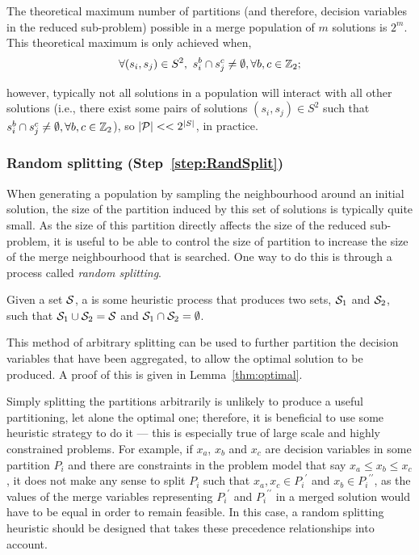 \documentclass[preprint]{elsarticle}
\begin{document}
The theoretical maximum number of partitions (and therefore, decision variables in the reduced sub-problem) possible in a merge population of $m$ solutions is $2^m$. This theoretical maximum is only achieved when,
\begin{equation*}
\forall (s_i,s_j) \in S^2,\ s^b_i \cap s^c_j \neq \emptyset, \forall b,c \in \Bin; \label{sec:merge:part:bound}
\end{equation*}

however, typically not all solutions in a population will interact with all other solutions (i.e., there exist some pairs of solutions $(s_i,s_j) \in S^2$ such that $s^b_i \cap s^c_j \neq \emptyset, \forall b,c \in \Bin$), so $|{\cal P}| << 2^{|S|}$, in practice.

\subsubsection*{\textbf{Random splitting (Step~\ref{step:RandSplit})}}

When generating a population by sampling the neighbourhood around an initial solution, the size of the partition induced by this set of solutions is typically quite small. As the size of this partition directly affects the size of the reduced sub-problem, it is useful to be able to control the size of partition to increase the size of the merge neighbourhood that is searched. One way to do this is through a process called \emph{random splitting}. 
%
\begin{definition}\label{def:split}
Given a set $\S{S}$, a  is some heuristic process that produces two sets, $\S{S}_1$ and $\S{S}_2$, such that $\S{S}_1 \cup \S{S}_2 = \S{S}$ and $\S{S}_1 \cap \S{S}_2 = \emptyset$.
\end{definition}
%
This method of arbitrary splitting can be used to further partition the decision variables that have been aggregated, to allow the optimal solution to be produced. A proof of this is given in Lemma~\ref{thm:optimal}. 

Simply splitting the partitions arbitrarily is unlikely to produce a useful partitioning, let alone the optimal one; therefore, it is beneficial to use some heuristic strategy to do it --- this is especially true of large scale and highly constrained problems. For example, if $x_a$, $x_b$ and $x_c$ are decision variables in some partition $P_i$ and there are constraints in the problem model that say $x_a \leq x_b \leq x_c$, it does not make any sense to split $P_i$ such that $x_a,x_c \in {P_i}^\prime$ and $x_b \in {P_i}^{\prime\prime}$, as the values of the merge variables representing ${P_i}^\prime$ and ${P_i}^{\prime\prime}$ in a merged solution would have to be equal in order to remain feasible. In this case, a random splitting heuristic should be designed that takes these precedence relationships into account.
\end{document}
